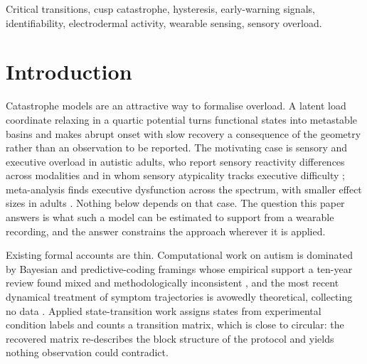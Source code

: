 \documentclass[conference]{IEEEtran}
\begin{document}
\begin{IEEEkeywords}
Critical transitions, cusp catastrophe, hysteresis, early-warning signals,
identifiability, electrodermal activity, wearable sensing, sensory overload.
\end{IEEEkeywords}

\section{Introduction}

Catastrophe models are an attractive way to formalise overload. A latent load
coordinate relaxing in a quartic potential turns functional states into
metastable basins and makes abrupt onset with slow recovery a consequence of
the geometry rather than an observation to be reported. The motivating case is sensory and executive overload in autistic adults, who
report sensory reactivity differences across modalities \cite{maclennan2022}
and in whom sensory atypicality tracks executive difficulty \cite{kiep2025};
meta-analysis finds executive dysfunction across the spectrum, with smaller
effect sizes in adults \cite{demetriou2018}. Nothing below depends on that
case. The question this paper answers is what such a model can be estimated to
support from a wearable recording, and the answer constrains the approach
wherever it is applied.

Existing formal accounts are thin. Computational work on autism is dominated
by Bayesian and predictive-coding framings whose empirical support a ten-year
review found mixed and methodologically inconsistent \cite{chrysaitis2023}, and
the most recent dynamical treatment of symptom trajectories is avowedly
theoretical, collecting no data \cite{adamou2026}. Applied state-transition
work assigns states from experimental condition labels and counts a transition
matrix, which is close to circular: the recovered matrix re-describes the block
structure of the protocol and yields nothing observation could contradict.
\end{document}
